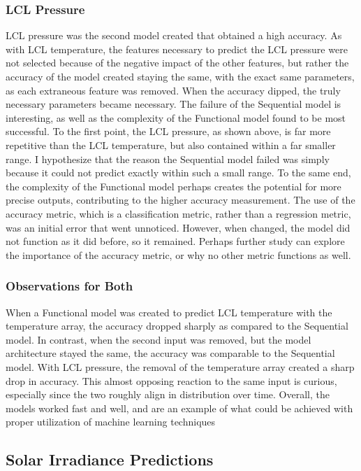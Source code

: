 \documentclass[conference]{IEEEtran}
\begin{document}
\subsubsection{LCL Pressure}
 LCL pressure was the second model created that obtained a high accuracy. As with LCL temperature, the features necessary to predict the LCL pressure were not selected because of the negative impact of the other features, but rather
the accuracy of the model created staying the same, with the exact same parameters, as each extraneous feature was removed. When the accuracy dipped, the truly necessary parameters became necessary. The failure of the Sequential model is interesting, as well as the complexity of the Functional model found to be most successful. To 
the first point, the LCL pressure, as shown above, is far more repetitive than the LCL temperature, but also contained within a far smaller range. I hypothesize that the reason the Sequential model failed was simply because it could not predict exactly
within such a small range. To the same end, the complexity of the Functional model perhaps creates the potential for more precise outputs, contributing to the higher accuracy measurement. The use of the accuracy metric, which is a classification metric, rather than a regression metric, was an initial error that went unnoticed. However, when changed, the model did not function as it did before, so it remained. Perhaps further study can explore the importance of the accuracy metric, or why no other metric functions as well.
\subsubsection{Observations for Both}
When a Functional model was created to predict LCL temperature with the temperature array, the accuracy dropped sharply as compared to the Sequential model. In contrast, when the second input was removed, but the model architecture stayed
the same, the accuracy was comparable to the Sequential model. With LCL pressure, the removal of the temperature array created a sharp drop in accuracy. This almost opposing reaction to the same input is curious, especially since the two roughly align in distribution over time. Overall, the models worked fast and well, and are an example of what could be achieved with proper utilization of machine learning techniques

\subsection{Solar Irradiance Predictions}
\end{document}
